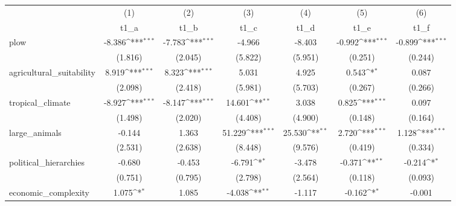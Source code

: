 {
\def\sym#1{\ifmmode^{#1}\else\(^{#1}\)\fi}
\begin{tabular}{l*{6}{c}}
\hline\hline
            &\multicolumn{1}{c}{(1)}&\multicolumn{1}{c}{(2)}&\multicolumn{1}{c}{(3)}&\multicolumn{1}{c}{(4)}&\multicolumn{1}{c}{(5)}&\multicolumn{1}{c}{(6)}\\
            &\multicolumn{1}{c}{t1\_a}&\multicolumn{1}{c}{t1\_b}&\multicolumn{1}{c}{t1\_c}&\multicolumn{1}{c}{t1\_d}&\multicolumn{1}{c}{t1\_e}&\multicolumn{1}{c}{t1\_f}\\
\hline
plow        &      -8.386\sym{***}&      -7.783\sym{***}&      -4.966         &      -8.403         &      -0.992\sym{***}&      -0.899\sym{***}\\
            &     (1.816)         &     (2.045)         &     (5.822)         &     (5.951)         &     (0.251)         &     (0.244)         \\
[1em]
agricultural\_suitability&       8.919\sym{***}&       8.323\sym{***}&       5.031         &       4.925         &       0.543\sym{*}  &       0.087         \\
            &     (2.098)         &     (2.418)         &     (5.981)         &     (5.703)         &     (0.267)         &     (0.266)         \\
[1em]
tropical\_climate&      -8.927\sym{***}&      -8.147\sym{***}&      14.601\sym{**} &       3.038         &       0.825\sym{***}&       0.097         \\
            &     (1.498)         &     (2.020)         &     (4.408)         &     (4.900)         &     (0.148)         &     (0.164)         \\
[1em]
large\_animals&      -0.144         &       1.363         &      51.229\sym{***}&      25.530\sym{**} &       2.720\sym{***}&       1.128\sym{***}\\
            &     (2.531)         &     (2.638)         &     (8.448)         &     (9.576)         &     (0.419)         &     (0.334)         \\
[1em]
political\_hierarchies&      -0.680         &      -0.453         &      -6.791\sym{*}  &      -3.478         &      -0.371\sym{**} &      -0.214\sym{*}  \\
            &     (0.751)         &     (0.795)         &     (2.798)         &     (2.564)         &     (0.118)         &     (0.093)         \\
[1em]
economic\_complexity&       1.075\sym{*}  &       1.085         &      -4.038\sym{**} &      -1.117         &      -0.162\sym{*}  &      -0.001         \\

\end{tabular}}
